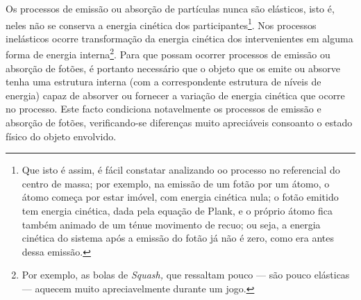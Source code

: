 Os processos de emissão ou absorção de partículas nunca são elásticos, isto é,
neles não se conserva a energia cinética dos participantes\footnote{Que isto é
assim, é fácil constatar analizando oo processo no referencial do centro de
massa; por exemplo, na emissão de um fotão por um átomo, o átomo começa por
estar imóvel, com energia cinética nula; o fotão emitido tem energia cinética,
dada pela equação de Plank, e o próprio átomo fica também animado de um ténue
movimento de recuo; ou seja, a energia cinética do sistema após a emissão do
fotão já não é zero, como era antes dessa emissão.}. Nos processos inelásticos
ocorre transformação da energia cinética dos intervenientes em alguma forma de
energia interna\footnote{Por exemplo, as bolas de \emph{Squash,} que ressaltam pouco --- são
pouco elásticas --- aquecem muito apreciavelmente durante um jogo.}. Para que
possam ocorrer processos de emissão ou absorção de fotões, é portanto necessário
que o objeto que os emite ou absorve tenha uma estrutura interna (com a
correspondente estrutura de níveis de energia) capaz de absorver ou fornecer a
variação de energia cinética que ocorre no processo. Este facto condiciona
notavelmente os processos de emissão e absorção de fotões, verificando-se
diferenças muito apreciáveis consoanto o estado físico do objeto envolvido.

